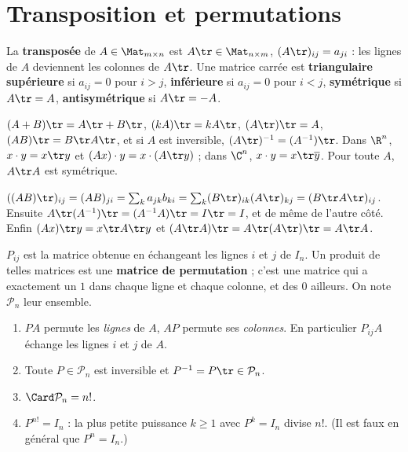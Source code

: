 \section{Transposition et permutations}
\begin{definition}
La \textbf{transposée} de $A\in\Mat_{m\times n}$ est $A\tr\in\Mat_{n\times m}$, $(A\tr)_{ij}=a_{ji}$ : les lignes de $A$ deviennent les colonnes de $A\tr$. Une matrice carrée est \textbf{triangulaire supérieure} si $a_{ij}=0$ pour $i>j$, \textbf{inférieure} si $a_{ij}=0$ pour $i<j$, \textbf{symétrique} si $A\tr=A$, \textbf{antisymétrique} si $A\tr=-A$.
\end{definition}
\begin{proposition}\label{prop-transposee}
$(A+B)\tr=A\tr+B\tr$, $(kA)\tr=kA\tr$, $(A\tr)\tr=A$, $(AB)\tr=B\tr A\tr$, et si $A$ est inversible, $(A\tr)^{-1}=(A^{-1})\tr$. Dans $\R^n$, $x\cdot y=x\tr y$ et $(Ax)\cdot y=x\cdot(A\tr y)$ ; dans $\C^n$, $x\cdot y=x\tr\overline y$. Pour toute $A$, $A\tr A$ est symétrique.
\end{proposition}
\begin{preuve}
$((AB)\tr)_{ij}=(AB)_{ji}=\sum_k a_{jk}b_{ki}=\sum_k(B\tr)_{ik}(A\tr)_{kj}=(B\tr A\tr)_{ij}$. Ensuite $A\tr(A^{-1})\tr=(A^{-1}A)\tr=I\tr=I$, et de même de l'autre côté. Enfin $(Ax)\tr y=x\tr A\tr y$ et $(A\tr A)\tr=A\tr(A\tr)\tr=A\tr A$.
\end{preuve}
\begin{definition}
$P_{ij}$ est la matrice obtenue en échangeant les lignes $i$ et $j$ de $I_n$. Un produit de telles matrices est une \textbf{matrice de permutation} ; c'est une matrice qui a exactement un $1$ dans chaque ligne et chaque colonne, et des $0$ ailleurs. On note $\mathcal P_n$ leur ensemble.
\end{definition}
\begin{proposition}\label{prop-permutation}
\begin{enumerate}
\item $PA$ permute les \emph{lignes} de $A$, $AP$ permute ses \emph{colonnes}. En particulier $P_{ij}A$ échange les lignes $i$ et $j$ de $A$.
\item Toute $P\in\mathcal P_n$ est inversible et $P^{-1}=P\tr\in\mathcal P_n$.
\item $\Card\mathcal P_n=n!$.
\item $P^{n!}=I_n$ : la plus petite puissance $k\ge1$ avec $P^k=I_n$ divise $n!$. (Il est faux en général que $P^n=I_n$.)
\end{enumerate}
\end{proposition}
